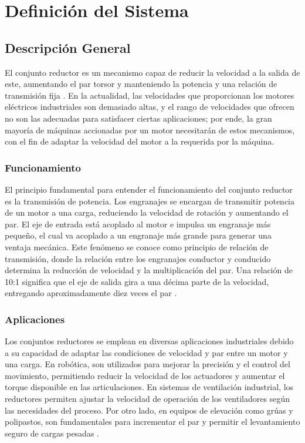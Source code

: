 \documentclass[conference]{IEEEtran}
\begin{document}
\section{Definición del Sistema}

\subsection{Descripción General}

El conjunto reductor es un mecanismo capaz de reducir la velocidad a la salida de este,
aumentando el par torsor y manteniendo la potencia y una relación de transmisión fija
\cite{tarancon2018}. En la actualidad, las velocidades que proporcionan los motores
eléctricos industriales son demasiado altas, y el rango de velocidades que ofrecen no son
las adecuadas para satisfacer ciertas aplicaciones; por ende, la gran mayoría de máquinas
accionadas por un motor necesitarán de estos mecanismos, con el fin de adaptar la
velocidad del motor a la requerida por la máquina.

\subsubsection{Funcionamiento}

El principio fundamental para entender el funcionamiento del conjunto reductor es la
transmisión de potencia. Los engranajes se encargan de transmitir potencia de un motor a
una carga, reduciendo la velocidad de rotación y aumentando el par. El eje de entrada está
acoplado al motor e impulsa un engranaje más pequeño, el cual va acoplado a un engranaje
más grande para generar una ventaja mecánica. Este fenómeno se conoce como principio de
relación de transmisión, donde la relación entre los engranajes conductor y conducido
determina la reducción de velocidad y la multiplicación del par. Una relación de 10:1
significa que el eje de salida gira a una décima parte de la velocidad, entregando
aproximadamente diez veces el par \cite{aox}.

\subsubsection{Aplicaciones}

Los conjuntos reductores se emplean en diversas aplicaciones industriales debido a su
capacidad de adaptar las condiciones de velocidad y par entre un motor y una carga. En
robótica, son utilizados para mejorar la precisión y el control del movimiento, permitiendo
reducir la velocidad de los actuadores y aumentar el torque disponible en las articulaciones.
En sistemas de ventilación industrial, los reductores permiten ajustar la velocidad de
operación de los ventiladores según las necesidades del proceso. Por otro lado, en equipos
de elevación como grúas y polipastos, son fundamentales para incrementar el par y permitir
el levantamiento seguro de cargas pesadas \cite{lopez2023}.
\end{document}

